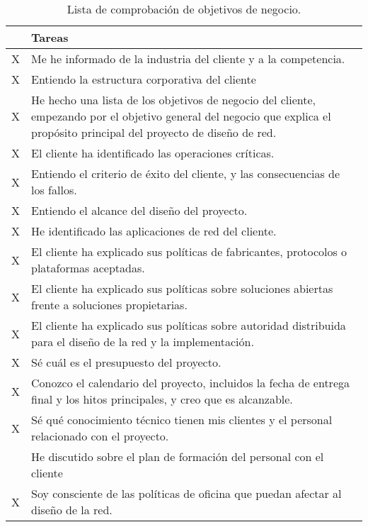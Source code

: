 \begin{table}[H]
	\begin{center}
		\begin{tabular}{|c|l|}
			\hline 
			 & Tareas  \\ 
			\hline \hline
			 X & Me he informado de la industria del cliente y a la competencia.  \\ \hline
			 X & Entiendo la estructura corporativa del cliente  \\ \hline
			 X & He hecho una lista de los objetivos de negocio del cliente, empezando por el objetivo general del negocio que explica el propósito principal del proyecto de diseño de red.  \\ \hline
			 X & El cliente ha identificado las operaciones críticas. \\ \hline
			 X & Entiendo el criterio de éxito del cliente, y las consecuencias de los
			 fallos.  \\ \hline
			 X & Entiendo el alcance del diseño del proyecto.  \\ \hline
			 X & He identificado las aplicaciones de red del cliente.  \\ \hline
			 X & El cliente ha explicado sus políticas de fabricantes, protocolos o
			 plataformas aceptadas.  \\ \hline
			 X & El cliente ha explicado sus políticas sobre soluciones abiertas frente a
			 soluciones propietarias.  \\ \hline
			 X & El cliente ha explicado sus políticas sobre autoridad distribuida para el
			 diseño de la red y la implementación.  \\ \hline
			 X & Sé cuál es el presupuesto del proyecto.  \\ \hline
			 X & Conozco el calendario del proyecto, incluidos la fecha de entrega final
			 y los hitos principales, y creo que es alcanzable.  \\ \hline
			 X & Sé qué conocimiento técnico tienen mis clientes y el personal
			 relacionado con el proyecto.  \\ \hline
			  & He discutido sobre el plan de formación del personal con el cliente  \\ \hline
			 X & Soy consciente de las políticas de oficina que puedan afectar al diseño
			 de la red.  \\ \hline
		\end{tabular}
		\caption{Lista de comprobación de objetivos de negocio.}
		\label{tabla:tabla1}
	\end{center}
\end{table}

